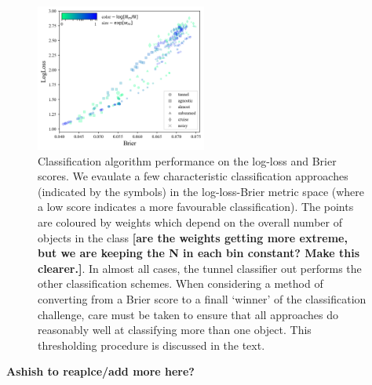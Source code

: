 \begin{figure}
	\begin{center}
		\includegraphics[width=0.5\textwidth]{./fig/all_effects_isolated.png}
		\caption{Classification algorithm performance on the log-loss and Brier scores. We evaulate a few characteristic classification approaches (indicated by the symbols) in the log-loss-Brier metric space (where a low score indicates a more favourable classification). The points are coloured by weights which depend on the overall number of objects in the class \textbf{[are the weights getting more extreme, but we are keeping the N in each bin constant? Make this clearer.]}. In almost all cases, the tunnel classifier out performs the other classification schemes. When considering a method of converting from a Brier score to a finall `winner' of the classification challenge, care must be taken to ensure that all approaches do reasonably well at classifying more than one object. This thresholding procedure is discussed in the text.}
		\label{fig:popweight}
	\end{center}
\end{figure}

\textbf{Ashish to reaplce/add more here?}






